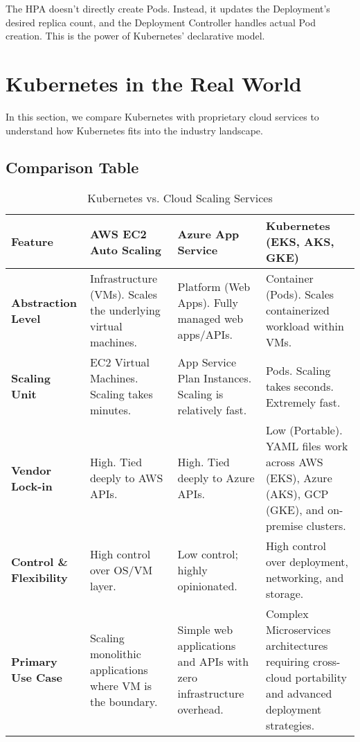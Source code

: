 \documentclass[12pt,a4paper]{article}
\begin{document}
\begin{importantbox}
The HPA doesn't directly create Pods. Instead, it updates the Deployment's desired replica count, and the Deployment Controller handles actual Pod creation. This is the power of Kubernetes' declarative model.
\end{importantbox}

\section{Kubernetes in the Real World}

In this section, we compare Kubernetes with proprietary cloud services to understand how Kubernetes fits into the industry landscape.

\subsection{Comparison Table}

\begin{table}[H]
\centering
\small
\begin{tabularx}{\textwidth}{|l|X|X|X|}
\toprule
\textbf{Feature} & \textbf{AWS EC2 Auto Scaling} & \textbf{Azure App Service} & \textbf{Kubernetes (EKS, AKS, GKE)} \\
\midrule
\textbf{Abstraction Level} &
Infrastructure (VMs). Scales the underlying virtual machines. &
Platform (Web Apps). Fully managed web apps/APIs. &
Container (Pods). Scales containerized workload within VMs. \\
\midrule
\textbf{Scaling Unit} &
EC2 Virtual Machines. Scaling takes minutes. &
App Service Plan Instances. Scaling is relatively fast. &
Pods. Scaling takes seconds. Extremely fast. \\
\midrule
\textbf{Vendor Lock-in} &
High. Tied deeply to AWS APIs. &
High. Tied deeply to Azure APIs. &
Low (Portable). YAML files work across AWS (EKS), Azure (AKS), GCP (GKE), and on-premise clusters. \\
\midrule
\textbf{Control \& Flexibility} &
High control over OS/VM layer. &
Low control; highly opinionated. &
High control over deployment, networking, and storage. \\
\midrule
\textbf{Primary Use Case} &
Scaling monolithic applications where VM is the boundary. &
Simple web applications and APIs with zero infrastructure overhead. &
Complex Microservices architectures requiring cross-cloud portability and advanced deployment strategies. \\
\bottomrule
\end{tabularx}
\caption{Kubernetes vs. Cloud Scaling Services}
\end{table}
\end{document}
